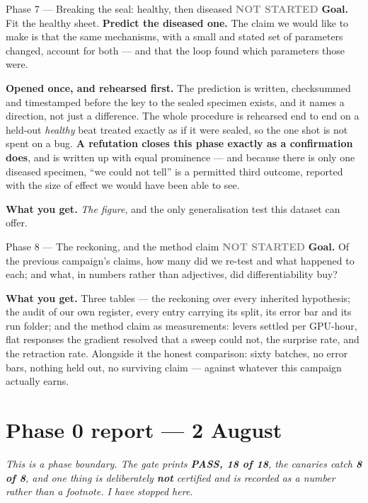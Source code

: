 \documentclass[11pt,a4paper]{article}
\newcommand{\todo}{\textcolor{grey}{\textbf{NOT STARTED}}}
\begin{document}
\begin{phasebox}{Phase 7 --- Breaking the seal: healthy, then diseased \hfill \todo}
\textbf{Goal.} Fit the healthy sheet. \textbf{Predict the diseased one.} The claim we would like to
make is that the same mechanisms, with a small and stated set of parameters changed, account for
both --- and that the loop found which parameters those were.

\textbf{Opened once, and rehearsed first.} The prediction is written, checksummed and timestamped
before the key to the sealed specimen exists, and it names a direction, not just a difference. The whole
procedure is rehearsed end to end on a held-out \emph{healthy} beat treated exactly as if it were
sealed, so the one shot is not spent on a bug. \textbf{A refutation closes this phase exactly as a
confirmation does}, and is written up with equal prominence --- and because there is only one
diseased specimen, ``we could not tell'' is a permitted third outcome, reported with the size of effect
we would have been able to see.

\textbf{What you get.} \emph{The figure}, and the only generalisation test this dataset can offer.
\end{phasebox}

\begin{phasebox}{Phase 8 --- The reckoning, and the method claim \hfill \todo}
\textbf{Goal.} Of the previous campaign's claims, how many did we re-test and what happened to each;
and what, in numbers rather than adjectives, did differentiability buy?

\textbf{What you get.} Three tables --- the reckoning over every inherited hypothesis; the audit of
our own register, every entry carrying its split, its error bar and its run folder; and the method
claim as measurements: levers settled per GPU-hour, flat responses the gradient resolved that a sweep
could not, the surprise rate, and the retraction rate. Alongside it the honest comparison: sixty
batches, no error bars, nothing held out, no surviving claim --- against whatever this campaign
actually earns.
\end{phasebox}

\section{Phase 0 report --- 2 August}\label{sec:p0report}

\emph{This is a phase boundary. The gate prints \textbf{PASS, 18 of 18}, the canaries catch
\textbf{8 of 8}, and one thing is deliberately \textbf{not} certified and is recorded as a number
rather than a footnote. I have stopped here.}
\end{document}
